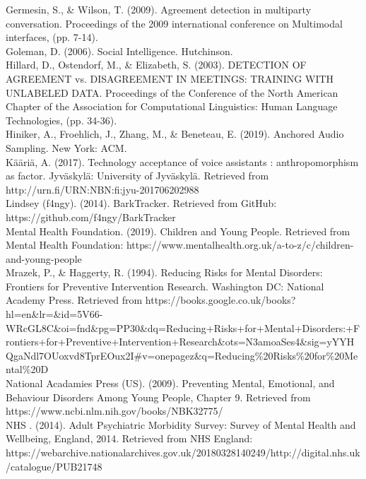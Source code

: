 \documentclass[a4paper,11pt]{report}
\begin{document}
Germesin, S., \& Wilson, T. (2009). Agreement detection in multiparty conversation. Proceedings of the 2009 international conference on Multimodal interfaces, (pp. 7-14).\\

Goleman, D. (2006). Social Intelligence. Hutchinson.\\

Hillard, D., Ostendorf, M., \& Elizabeth, S. (2003). DETECTION OF AGREEMENT vs. DISAGREEMENT IN MEETINGS: TRAINING WITH UNLABELED DATA. Proceedings of the Conference of the North American Chapter of the Association for Computational Linguistics: Human Language Technologies, (pp. 34-36).\\

Hiniker, A., Froehlich, J., Zhang, M., \& Beneteau, E. (2019). Anchored Audio Sampling. New York: ACM.\\

Kääriä, A. (2017). Technology acceptance of voice assistants : anthropomorphism as factor. Jyväskylä: University of Jyväskylä. Retrieved from http://urn.fi/URN:NBN:fi:jyu-201706202988\\

Lindsey (f4ngy). (2014). BarkTracker. Retrieved from GitHub: https://github.com/f4ngy/BarkTracker\\

Mental Health Foundation. (2019). Children and Young People. Retrieved from Mental Health Foundation: https://www.mentalhealth.org.uk/a-to-z/c/children-and-young-people\\

Mrazek, P., \& Haggerty, R. (1994). Reducing Risks for Mental Disorders: Frontiers for Preventive Intervention Research. Washington DC: National Academy Press. Retrieved from https://books.google.co.uk/books?hl=en\&lr=\&id=5V66-WRcGL8C\&oi=fnd\&pg=PP30\&dq=Reducing+Risks+for+Mental+Disorders:+Frontiers+for+Preventive+Intervention+Research\&ots=N3amoaSes4\&sig=yYYHQgaNdl7OUoxvd8TprEOux2I\#v=onepagez\&q=Reducing\%20Risks\%20for\%20Mental\%20D\\

National Acadamies Press (US). (2009). Preventing Mental, Emotional, and Behaviour Disorders Among Young People, Chapter 9. Retrieved from https://www.ncbi.nlm.nih.gov/books/NBK32775/\\

NHS . (2014). Adult Psychiatric Morbidity Survey: Survey of Mental Health and Wellbeing, England, 2014. Retrieved from NHS England: https://webarchive.nationalarchives.gov.uk/20180328140249/http://digital.nhs.uk/catalogue/PUB21748\\
\end{document}

